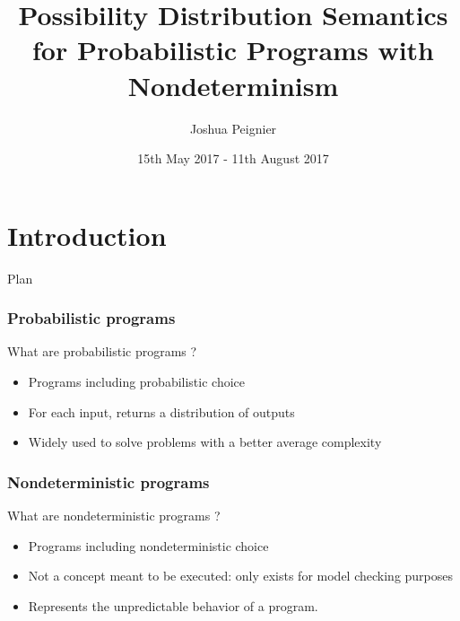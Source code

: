 \documentclass{beamer}
\title{\textbf{Possibility Distribution Semantics for Probabilistic Programs with Nondeterminism}}
\author{Joshua Peignier}
\date{15th May 2017 - 11th August 2017}
\begin{document}
\frame{\titlepage}




\section{Introduction}
\begin{frame}{Plan}
  \tableofcontents[sectionstyle=show/shaded]%
\end{frame}

\begin{frame}
\frametitle{Probabilistic programs}
What are probabilistic programs ?
\begin{itemize}
\item<2-> Programs including probabilistic choice
\item<3-> For each input, returns a distribution of outputs
\item<4-> Widely used to solve problems with a better average complexity 
\end{itemize}
\end{frame}

\begin{frame}
\frametitle{Nondeterministic programs}
What are nondeterministic programs ?
\begin{itemize}
\item<2-> Programs including nondeterministic choice
\item<3-> Not a concept meant to be executed: only exists for model checking purposes
\item<4-> Represents the unpredictable behavior of a program.
\end{itemize}
\end{frame}
\end{document}
